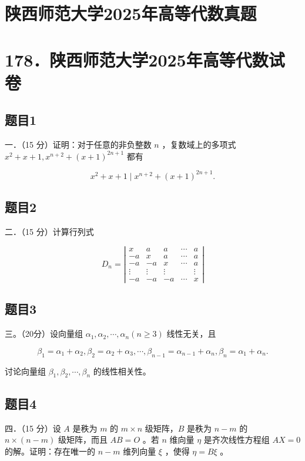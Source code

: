 \documentclass{article}
\begin{document}
\section*{陕西师范大学2025年高等代数真题}
\section*{178．陕西师范大学2025年高等代数试卷}

\subsection{题目1}
一．（15 分）证明：对于任意的非负整数 \(n\) ，复数域上的多项式 \(x^{2}+x+1, x^{n+2}+(x+1)^{2 n+1}\) 都有

\[
x^{2}+x+1 \mid x^{n+2}+(x+1)^{2 n+1} .
\]

\subsection{题目2}
二．（15 分）计算行列式

\[
D_{n}=\left|\begin{array}{ccccc}
x & a & a & \cdots & a \\
-a & x & a & \cdots & a \\
-a & -a & x & \cdots & a \\
\vdots & \vdots & \vdots & & \vdots \\
-a & -a & -a & \cdots & x
\end{array}\right|
\]

\subsection{题目3}
三。（20分）设向量组 \(\alpha_{1}, \alpha_{2}, \cdots, \alpha_{n}(n \geq 3)\) 线性无关，且

\[
\beta_{1}=\alpha_{1}+\alpha_{2}, \beta_{2}=\alpha_{2}+\alpha_{3}, \cdots, \beta_{n-1}=\alpha_{n-1}+\alpha_{n}, \beta_{n}=\alpha_{1}+\alpha_{n} .
\]

讨论向量组 \(\beta_{1}, \beta_{2}, \cdots, \beta_{n}\) 的线性相关性。

\subsection{题目4}
四．（15 分）设 \(A\) 是秩为 \(m\) 的 \(m \times n\) 级矩阵，\(B\) 是秩为 \(n-m\) 的 \(n \times(n-m)\) 级矩阵，而且 \(A B=O\) 。若 \(n\) 维向量 \(\eta\) 是齐次线性方程组 \(A X=0\) 的解。证明：存在唯一的 \(n-m\) 维列向量 \(\xi\) ，使得 \(\eta=B \xi\) 。
\end{document}
